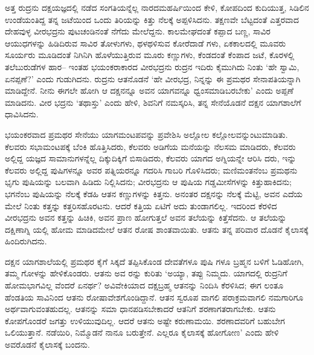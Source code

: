 ಅತ್ತ ರುದ್ರನು ದಕ್ಷಯಜ್ಞದಲ್ಲಿ ನಡೆದ ಸಂಗತಿಯನ್ನೆಲ್ಲ ನಾರದಮಹರ್ಷಿಯಿಂದ ಕೇಳಿ, ಕೋಪದಿಂದ ಕುದಿಯುತ್ತ, ಸಿಡಿಲಿನ ಉಂಡೆಯಂತಿದ್ದ ತನ್ನ ಜಟೆಯಿಂದ ಒಂದು ತಿರಿಯನ್ನು ಕಿತ್ತು ನೆಲಕ್ಕೆ ಅಪ್ಪಳಿಸಿದನು. ತಕ್ಷಣವೇ ಬೆಟ್ಟದಂತೆ ಎತ್ತರವಾದ ದೇಹವುಳ್ಳ ವೀರಭದ್ರನು ಪುಟಚಂಡಿನಂತೆ ನೆಗೆದು ಮೇಲೆದ್ದನು. ಕಾಲಮೇಘದಂತೆ ಕಪ್ಪಾದ ಬಣ್ಣ, ಸಾವಿರ ಆಯುಧಗಳನ್ನು ಹಿಡಿದಿರುವ ಸಾವಿರ ತೋಳುಗಳು, ಥಳಥಳಿಸುವ ಕೋರೆದಾಡೆ ಗಳು, ಏಕಕಾಲದಲ್ಲಿ ಮೂವರು ಸೂರ್ಯರು ಮೂಡಿದಂತೆ ನಿಗಿನಿಗಿ ಹೊಳೆಯುತ್ತಿರುವ ಮೂರು ಕಣ್ಣುಗಳು, ಕೆಂಡದಂತೆ ಕೆಂಪಾದ ಜಟೆ, ಕೊರಳಲ್ಲಿ ತಲೆಬುರುಡೆಗಳ ಹಾರ– ಇಂತಹ ಭಯಂಕರಾಕಾರದ ವೀರಭದ್ರನು ರುದ್ರನ ಇದಿರು ಕೈಮುಗಿದು ನಿಂತು ‘ಹೇ ಸ್ವಾಮಿ, ಏನಪ್ಪಣೆ?’ ಎಂದು ಗುಡುಗಿದನು. ರುದ್ರನು ಆತನೊಡನೆ ‘ಹೇ ವೀರಭದ್ರ, ನಿನ್ನನ್ನು ಈ ಪ್ರಮಥರ ಸೇನಾಪತಿಯನ್ನಾಗಿ ಮಾಡಿದ್ದೇನೆ. ನೀನು ಈಗಲೇ ಹೋಗಿ ಆ ದಕ್ಷನನ್ನೂ ಅವನ ಯಾಗವನ್ನೂ ಧ್ವಂಸಮಾಡಿಬರಬೇಕು’ ಎಂದು ಅಪ್ಪಣೆ ಮಾಡಿದನು. ವೀರ ಭದ್ರನು ‘ತಥಾಸ್ತು’ ಎಂದು ಹೇಳಿ, ಶಿವನಿಗೆ ನಮಸ್ಕರಿಸಿ, ತನ್ನ ಸೇನೆಯೊಡನೆ ದಕ್ಷನ ಯಾಗಶಾಲೆಗೆ ಧಾವಿಸಿದನು.

ಭಯಂಕರವಾದ ಪ್ರಮಥರ ಸೇನೆಯು ಯಾಗಮಂಟಪವನ್ನು ಪ್ರವೇಶಿಸಿ ಅಲ್ಲೋಲ ಕಲ್ಲೋಲವನ್ನುಂಟುಮಾಡಿತು. ಕೆಲವರು ಸಭಾಮಂಟಪಕ್ಕೆ ಬೆಂಕಿ ಹೊತ್ತಿಸಿದರು, ಕೆಲವರು ಅಡಿಗೆಯ ಮನೆಯನ್ನು ನೆಲಸಮ ಮಾಡಿದರು, ಕೆಲವರು ಅಲ್ಲಿದ್ದ ಯಜ್ಞದ ಸಾಮಾನುಗಳನ್ನೆಲ್ಲ ದಿಕ್ಕುದಿಕ್ಕಿಗೆ ಬಿಸಾಡಿದರು, ಕೆಲವರು ಯಾಗದ ಅಗ್ನಿಯನ್ನೇ ಆರಿಸಿ ದರು, ಇನ್ನು ಕೆಲವರು ಅಲ್ಲಿದ್ದ ಪುಷಿಗಳನ್ನೂ ಅವರ ಪತ್ನಿಯರನ್ನೂ ಗದರಿಸಿ ಗಾಬರಿ ಗೊಳಿಸಿದರು; ಮಣಿಮಂತನೆಂಬ ಪ್ರಮಥನು ಭೃಗು ಪುಷಿಯನ್ನು ಬಲವಾಗಿ ಹಿಡಿದು ನಿಲ್ಲಿಸಿದನು; ವೀರಭದ್ರನು ಆ ಪುಷಿಯ ಗಡ್ಡಮೀಸೆಗಳನ್ನು ಕಿತ್ತುಹಾಕಿದನು; ಭಗನೆಂಬ ಪುಷಿಯನ್ನು ನೆಲಕ್ಕೆ ಕೆಡಹಿ ಆತನ ಕಣ್ಣುಗಳನ್ನು ಕಿತ್ತನು. ಅನಂತರ ದಕ್ಷನನ್ನು ನೆಲಕ್ಕೆ ಮೆಟ್ಟಿ, ಅವನ ಎದೆಯ ಮೇಲೆ ನಿಂತು ಕತ್ತನ್ನು ಕತ್ತರಿಸಹೊರಟನು. ಆದರೆ ಕತ್ತಿಯ ಏಟಿಗೆ ಅದು ತುಂಡಾಗಲಿಲ್ಲ. ಇದರಿಂದ ಕೆರಳಿದ ವೀರಭದ್ರನು ಅವನ ಕತ್ತನ್ನು ಹಿಚಿಕಿ, ಅವನ ಪ್ರಾಣ ಹೋಗುತ್ತಲೆ ಅವನ ತಲೆಯನ್ನು ಕಿತ್ತೆಸೆದನು. ಆ ತಲೆಯನ್ನು ದಕ್ಷಿಣಾಗ್ನಿ ಯಲ್ಲಿ ಹೋಮ ಮಾಡಿದಮೇಲೆ ಆತನ ರೋಷ ಶಾಂತವಾಯಿತು. ಆತನು ತನ್ನ ಪರಿವಾರ ದೊಡನೆ ಕೈಲಾಸಕ್ಕೆ ಹಿಂದಿರುಗಿದನು.

ದಕ್ಷನ ಯಾಗಶಾಲೆಯಲ್ಲಿ ಪ್ರಮಥರ ಕೈಗೆ ಸಿಕ್ಕದೆ ತಪ್ಪಿಸಿಕೊಂಡ ದೇವತೆಗಳೂ ಪುಷಿ ಗಳೂ ಬ್ರಹ್ಮನ ಬಳಿಗೆ ಓಡಿಹೋಗಿ, ತಮ್ಮ ಗೋಳನ್ನು ಹೇಳಿಕೊಂಡರು. ಆತನು ಅವ ರನ್ನು ಕುರಿತು ‘ಅಯ್ಯಾ, ತಪ್ಪು ನಿಮ್ಮದು. ಯಾಗದಲ್ಲಿ ರುದ್ರನಿಗೆ ಹೋಮಭಾಗವಿಲ್ಲ ವೆಂದರೆ ಏನರ್ಥ? ಅವಿವೇಕಿಯಾದ ದಕ್ಷಬ್ರಹ್ಮ ಆತನನ್ನು ನಿಂದಿಸಿ ಕೆರಳಿಸಿದ; ಈಗ ಲಂತೂ ಹೆಂಡತಿಯ ಸಾವಿನಿಂದ ಆತನು ರೋಷಾವೇಶಗೊಂಡಿದ್ದಾನೆ. ಆತನ ಸ್ವರೂಪ ವಾಗಲಿ ಪರಾಕ್ರಮವಾಗಲಿ ನಮಗಾರಿಗೂ ಅರ್ಥವಾಗುವಂತಹುದಲ್ಲ. ಆತನನ್ನು ಸಮಾ ಧಾನಪಡಿಸಬೇಕಾದರೆ ಆತನಿಗೆ ಶರಣಾಗತರಾಗಬೇಕು. ಆತನು ಕೋಪಗೊಂಡರೆ ಜಗತ್ತು ಉಳಿಯುವುದಿಲ್ಲ. ಆದರೆ ಆತನು ಅಷ್ಟೇ ಕರುಣಾಮಯಿ. ಶರಣಾದವರಿಗೆ ಬಹುಬೇಗ ಒಲಿಯುತ್ತಾನೆ. ನಡೆಯಿರಿ, ನಿಮ್ಮೊಡನೆ ನಾನೂ ಬರುತ್ತೇನೆ. ಎಲ್ಲರೂ ಕೈಲಾಸಕ್ಕೆ ಹೋಗೋಣ’ ಎಂದು ಹೇಳಿ ಅವರೊಡನೆ ಕೈಲಾಸಕ್ಕೆ ಬಂದನು.

